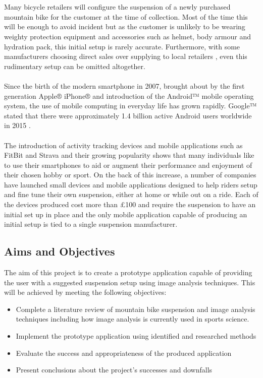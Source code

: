 	\\\\
	Many bicycle retailers will configure the suspension of a newly purchased mountain bike for the customer at the time of collection. Most of the time this will be enough to avoid incident but as the customer is unlikely to be wearing weighty protection equipment and accessories such as helmet, body armour and hydration pack, this initial setup is rarely accurate. Furthermore, with some manufacturers choosing direct sales over
	supplying to local retailers \citep{roseonline,ytonline}, even this rudimentary setup can be omitted altogether.
	\\\\
	Since the birth of the modern smartphone in 2007, brought about by the first generation Apple® iPhone® and introduction of the Android™ mobile operating system, the use of mobile computing in everyday life has grown rapidly. Google™ stated that there were approximately 1.4 billion active Android users worldwide in 2015 \citep{androidusers}.
	\\\\
	The introduction of activity tracking devices and mobile applications such as FitBit \citep{fitbit} and Strava \citep{strava} and their growing popularity \citep{apppopularity} shows that many individuals like to use their smartphones to aid or augment their performance and enjoyment of their chosen hobby or sport. On the back of this increase, a number of companies have launched small devices \citep{sussmybike, shockwiztrademark} and mobile applications \citep{foxird} designed to help riders setup and fine tune their own suspension, either at home or while out on a ride. Each of the devices produced cost more than £100 and require the suspension to have an initial set up in place and the only mobile application capable of producing an initial setup is tied to a single suspension manufacturer.
\subsection{Aims and Objectives}\label{sec:aims_and_objectives}
	The aim of this project is to create a prototype application capable of providing the user with a suggested suspension setup using image analysis techniques. This will be achieved by meeting the following objectives:
	\begin{itemize}
		\item Complete a literature review of mountain bike suspension and image analysis techniques including how image analysis is currently used in sports science.
		\item Implement the prototype application using identified and researched methods
		\item Evaluate the success and appropriateness of the produced application
		\item Present conclusions about the project's successes and downfalls
	\end{itemize}
